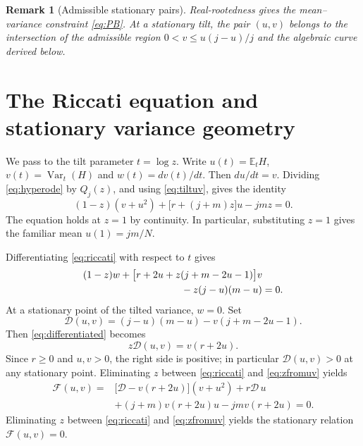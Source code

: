 \documentclass[11pt,a4paper]{article}
\newtheorem{remark}[theorem]{Remark}
\DeclareMathOperator{\Var}{Var}\DeclareMathOperator{\Cov}{Cov}\DeclareMathOperator{\Hyp}{Hyp}\DeclareMathOperator{\Bern}{Bern}\DeclareMathOperator{\supp}{supp}\DeclareMathOperator{\artanh}{artanh}
\newcommand{\E}{\mathbb E}\newcommand{\R}{\mathbb R}\newcommand{\N}{\mathbb N}\newcommand{\one}{\mathbf1}
\begin{document}
\begin{remark}[Admissible stationary pairs]
Real-rootedness gives the mean--variance constraint \eqref{eq:PB}. At a stationary tilt, the pair $(u,v)$ belongs to the intersection of the admissible region $0<v\le u(j-u)/j$ and the algebraic curve derived below.
\end{remark}

\section{The Riccati equation and stationary variance geometry}\label{sec:stationary}
We pass to the tilt parameter $t=\log z$. Write $u(t)=\E_tH$, $v(t)=\Var_t(H)$ and $w(t)=dv(t)/dt$. Then $du/dt=v$. Dividing \eqref{eq:hyperode} by $Q_j(z)$, and using \eqref{eq:tiltuv}, gives the identity
\begin{equation}\label{eq:riccati}
 \boxed{\ (1-z)(v+u^2)+\bigl[r+(j+m)z\bigr]u-jmz=0.\ }
\end{equation}
The equation holds at $z=1$ by continuity. In particular, substituting $z=1$ gives the familiar mean $u(1)=jm/N$.

Differentiating \eqref{eq:riccati} with respect to $t$ gives
\begin{align}\label{eq:differentiated}
 &(1-z)w+\bigl[r+2u+z(j+m-2u-1)\bigr]v\notag\\
 &\hspace{35mm}-z(j-u)(m-u)=0.
\end{align}
At a stationary point of the tilted variance, $w=0$. Set
\begin{equation}\label{eq:Dden}
 \mathcal D(u,v)=(j-u)(m-u)-v(j+m-2u-1).
\end{equation}
Then \eqref{eq:differentiated} becomes
\begin{equation}\label{eq:zfromuv}
 z\mathcal D(u,v)=v(r+2u).
\end{equation}
Since $r\ge0$ and $u,v>0$, the right side is positive; in particular $\mathcal D(u,v)>0$ at any stationary point. Eliminating $z$ between \eqref{eq:riccati} and \eqref{eq:zfromuv} yields
\begin{equation}\label{eq:F}
 \boxed{\begin{aligned}
 \mathcal F(u,v)={}&\bigl[\mathcal D-v(r+2u)\bigr](v+u^2)
 +r\mathcal D\,u\\
 &+(j+m)v(r+2u)u-jmv(r+2u)=0.
 \end{aligned}}
\end{equation}
Eliminating $z$ between \eqref{eq:riccati} and \eqref{eq:zfromuv} yields the stationary relation $\mathcal F(u,v)=0$.
\end{document}
